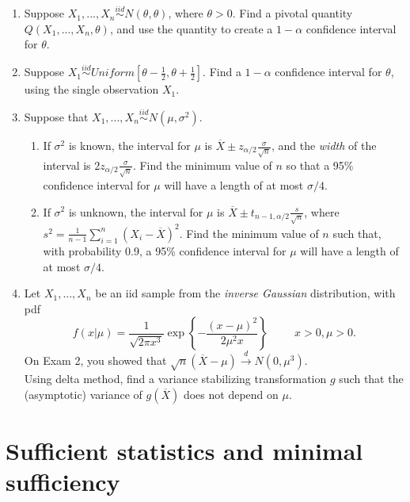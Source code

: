 \documentclass[11pt]{article}
\begin{document}
\begin{enumerate}

\item Suppose $X_1,...,X_n \overset{iid}{\sim} N(\theta, \theta)$, where $\theta > 0$. Find a pivotal quantity $Q(X_1,...,X_n, \theta)$, and use the quantity to create a $1 - \alpha$ confidence interval for $\theta$.

\item Suppose $X_1 \overset{iid}{\sim} Uniform[\theta - \frac{1}{2}, \theta + \frac{1}{2}]$. Find a $1 - \alpha$ confidence interval for $\theta$, using the single observation $X_1$.

\item Suppose that $X_1,...,X_n \overset{iid}{\sim} N(\mu, \sigma^2)$. 

\begin{enumerate}
\item If $\sigma^2$ is known, the interval for $\mu$ is $\overline{X} \pm z_{\alpha/2} \frac{\sigma}{\sqrt{n}}$, and the \textit{width} of the interval is $2z_{\alpha/2} \frac{\sigma}{\sqrt{n}}$. Find the minimum value of $n$ so that a 95\% confidence interval for $\mu$ will have a length of at most $\sigma/4$.

\item If $\sigma^2$ is unknown, the interval for $\mu$ is $\overline{X} \pm t_{n-1, \alpha/2} \frac{s}{\sqrt{n}}$, where $s^2 = \frac{1}{n-1} \sum \limits_{i=1}^n (X_i - \overline{X})^2$. Find the minimum value of $n$ such that, with probability 0.9, a 95\% confidence interval for $\mu$ will have a length of at most $\sigma/4$.
\end{enumerate}

\item Let $X_1,...,X_n$ be an iid sample from the \textit{inverse Gaussian} distribution, with pdf
$$f(x|\mu) = \frac{1}{\sqrt{2 \pi x^3}} \exp \left\lbrace - \frac{(x - \mu)^2}{2 \mu^2 x} \right\rbrace \hspace{1cm} x > 0, \mu > 0.$$
On Exam 2, you showed that $\sqrt{n}(\overline{X} - \mu) \overset{d}{\to} N(0, \mu^3)$.\\

Using delta method, find a variance stabilizing transformation $g$ such that the (asymptotic) variance of $g(\overline{X})$ does not depend on $\mu$.

\end{enumerate}

\section*{Sufficient statistics and minimal sufficiency}
\end{document}

